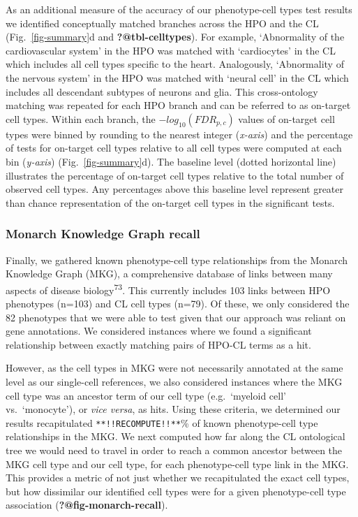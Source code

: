 \documentclass[
sn-nature
]{sn-jnl}
\begin{document}
As an additional measure of the accuracy of our phenotype-cell types
test results we identified conceptually matched branches across the HPO
and the CL (Fig.~\ref{fig-summary}d and \textbf{?@tbl-celltypes}). For
example, `Abnormality of the cardiovascular system' in the HPO was
matched with `cardiocytes' in the CL which includes all cell types
specific to the heart. Analogously, `Abnormality of the nervous system'
in the HPO was matched with `neural cell' in the CL which includes all
descendant subtypes of neurons and glia. This cross-ontology matching
was repeated for each HPO branch and can be referred to as on-target
cell types. Within each branch, the \(-log_{10}(FDR _{p,c})\) values of
on-target cell types were binned by rounding to the nearest integer
(\emph{x-axis}) and the percentage of tests for on-target cell types
relative to all cell types were computed at each bin (\emph{y-axis})
(Fig.~\ref{fig-summary}d). The baseline level (dotted horizontal line)
illustrates the percentage of on-target cell types relative to the total
number of observed cell types. Any percentages above this baseline level
represent greater than chance representation of the on-target cell types
in the significant tests.

\subsubsection{Monarch Knowledge Graph
recall}\label{monarch-knowledge-graph-recall-1}

Finally, we gathered known phenotype-cell type relationships from the
Monarch Knowledge Graph (MKG), a comprehensive database of links between
many aspects of disease biology\textsuperscript{73}. This currently
includes 103 links between HPO phenotypes (n=103) and CL cell types
(n=79). Of these, we only considered the 82 phenotypes that we were able
to test given that our approach was reliant on gene annotations. We
considered instances where we found a significant relationship between
exactly matching pairs of HPO-CL terms as a hit.

However, as the cell types in MKG were not necessarily annotated at the
same level as our single-cell references, we also considered instances
where the MKG cell type was an ancestor term of our cell type
(e.g.~`myeloid cell' vs.~`monocyte'), or \emph{vice versa}, as hits.
Using these criteria, we determined our results recapitulated
\texttt{**!!RECOMPUTE!!**}\% of known phenotype-cell type relationships
in the MKG. We next computed how far along the CL ontological tree we
would need to travel in order to reach a common ancestor between the MKG
cell type and our cell type, for each phenotype-cell type link in the
MKG. This provides a metric of not just whether we recapitulated the
exact cell types, but how dissimilar our identified cell types were for
a given phenotype-cell type association (\textbf{?@fig-monarch-recall}).
\end{document}
